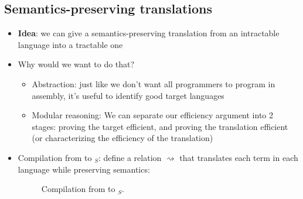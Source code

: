 \documentclass{tufte-handout}
\begin{document}
\subsection{Semantics-preserving translations}
\begin{itemize}
  \item \textbf{Idea}: we can give a semantics-preserving translation from an
  intractable language into a tractable one
  \item Why would we want to do that?
  \begin{itemize}
    \item Abstraction: just like we don't want all programmers to program in
    assembly, it's useful to identify good target languages
    \item Modular reasoning: We can separate our efficiency argument into 2 stages: 
    proving the target efficient, and proving the translation efficient (or characterizing 
    the efficiency of the translation)
  \end{itemize}
  \item Compilation from \prop{} to \prop{}$_S$: define a relation $\rightsquigarrow$ 
  that translates each term in each language while preserving semantics:

  \begin{figure}[h]
   \caption{Compilation from \prop{} to \prop{}$_S$.}
   \label{fig:compile}
  \end{figure}


\end{itemize}
\end{document}
